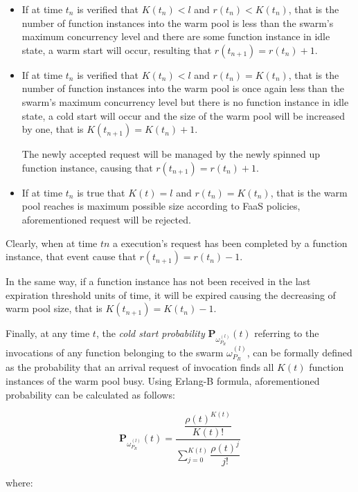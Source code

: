 \documentclass[12pt,a4paper]{report}
\theoremstyle{definition}
\begin{document}
\begin{itemize}
	\item If at time $t_n$ is verified that $K(t_n) < l$ and $r(t_n) < K(t_n)$, that is the number of function instances into the warm pool is less than the swarm's maximum concurrency level and there are some function instance in idle state, a warm start will occur, resulting that $r(t_{n+1}) = r(t_n) + 1$.
	
	
	\item If at time $t_n$ is verified that $K(t_n) < l$ and $r(t_n) = K(t_n)$, that is the number of function instances into the warm pool is once again less than the swarm's maximum concurrency level but there is no function instance in idle state, a cold start will occur and the size of the warm pool will be increased by one, that is $K(t_{n+1}) = K(t_n) + 1$.
	
	The newly accepted request will be managed by the newly spinned up function instance, causing that $r(t_{n+1}) = r(t_n) + 1$.
	
	\item If at time $t_n$ is true that $K(t) = l$ and $r(t_n) = K(t_n)$, that is the warm pool reaches is maximum possible size according to FaaS policies, aforementioned request will be rejected.
\end{itemize}

Clearly, when at time $tn$ a execution's request has been completed by a function instance, that event cause that $r(t_{n+1}) = r(t_n) - 1$. 

In the same way, if a function instance has not been received in the last expiration threshold units of time, it will be expired causing the decreasing of warm pool size, that is $K(t_{n+1}) = K(t_n) -1$.

Finally, at any time $t$, the \textit{cold start probability} $\textbf{P}_{\omega_{P_R}^{(l)}}(t)$ referring to the invocations of any function belonging to the swarm $\omega_{P_R}^{(l)}$, can be formally defined as the probability that an arrival request of invocation finds all $K(t)$ function instances of the warm pool busy. Using Erlang-B formula, aforementioned probability can be calculated as follows:

\begin{equation}
	\displaystyle \textbf{P}_{\omega_{P_R}^{(l)}}(t) = \dfrac{\dfrac{\rho(t)^{K(t)}}{K(t)!}}{\displaystyle\sum_{j=0}^{K(t)} \dfrac{\rho(t)^j}{j!}}
\end{equation}

where:
\end{document}
